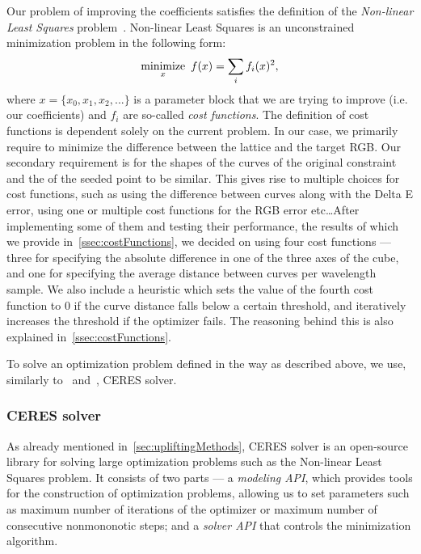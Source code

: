 Our problem of improving the coefficients satisfies the definition of the \emph{Non-linear Least Squares} problem~\cite{nonLinearLeastSquares}. Non-linear Least Squares is an unconstrained minimization problem in the following form:
\begin{equation} \label{eq:nonLinearLeastSquares}
\underset{x}{\text{minimize}} \hspace{0.5em} f(x) = \sum_{i} f_{i}(x)^{2},
\end{equation}
where $x= \{x_{0}, x_{1}, x_{2}, ... \}$ is a parameter block that we are trying to improve (i.e. our coefficients) and $f_{i}$ are so-called \emph{cost functions}. The definition of cost functions is dependent solely on the current problem. In our case, we primarily require to minimize the difference between the lattice and the target RGB. Our secondary requirement is for the shapes of the curves of the original constraint and the of the seeded point to be similar. This gives rise to multiple choices for cost functions, such as using the difference between curves along with the Delta E error, using one or multiple cost functions for the RGB error etc\ldots After implementing some of them and testing their performance, the results of which we provide in~\cref{ssec:costFunctions}, we decided on using four cost functions --- three for specifying the absolute difference in one of the three axes of the cube, and one for specifying the average distance between curves per wavelength sample. We also include a heuristic which sets the value of the fourth cost function to 0 if the curve distance falls below a certain threshold, and iteratively increases the threshold if the optimizer fails. The reasoning behind this is also explained in~\cref{ssec:costFunctions}.

To solve an optimization problem defined in the way as described above, we use, similarly to~\citet{upsamplingJakobHanika} and~\citet{upsamplingFluorescence}, CERES solver.

\subsubsection{CERES solver} \label{sssec:ceresSolver}

As already mentioned in~\cref{sec:upliftingMethods}, CERES solver is an open-source library for solving large optimization problems such as the Non-linear Least Squares problem. It consists of two parts --- a \emph{modeling API}, which provides tools for the construction of optimization problems, allowing us to set parameters such as maximum number of iterations of the optimizer or maximum number of consecutive nonmononotic steps; and a \emph{solver API} that controls the minimization algorithm.

